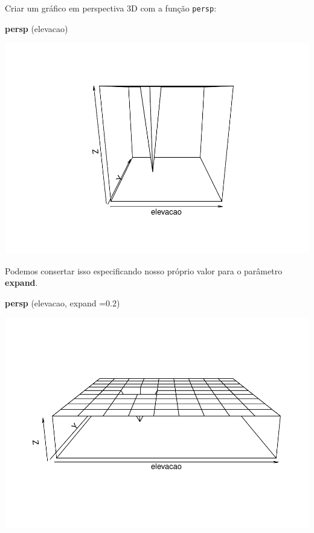 \documentclass[]{book}
\newenvironment{Shaded}{\begin{snugshade}}{\end{snugshade}}
\newcommand{\DataTypeTok}[1]{\textcolor[rgb]{0.13,0.29,0.53}{#1}}
\newcommand{\FloatTok}[1]{\textcolor[rgb]{0.00,0.00,0.81}{#1}}
\newcommand{\KeywordTok}[1]{\textcolor[rgb]{0.13,0.29,0.53}{\textbf{#1}}}
\newcommand{\NormalTok}[1]{#1}
\begin{document}
Criar um gráfico em perspectiva 3D com a função \texttt{persp}:

\begin{Shaded}
\begin{Highlighting}[]
\KeywordTok{persp}\NormalTok{ (elevacao)}
\end{Highlighting}
\end{Shaded}

\includegraphics{TudodoR_files/figure-latex/unnamed-chunk-72-1.pdf}

Podemos consertar isso especificando nosso próprio valor para o parâmetro \textbf{expand}.

\begin{Shaded}
\begin{Highlighting}[]
\KeywordTok{persp}\NormalTok{ (elevacao, }\DataTypeTok{expand =}\FloatTok{0.2}\NormalTok{)}
\end{Highlighting}
\end{Shaded}

\includegraphics{TudodoR_files/figure-latex/unnamed-chunk-73-1.pdf}
\end{document}
